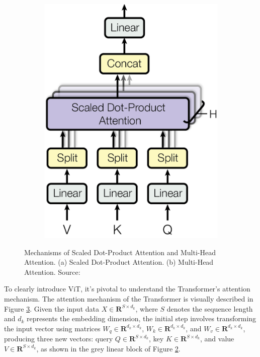 \begin{figure}
\begin{subfigure}[b]{0.2\textwidth}
        \caption{}
        \label{fig:dotproductattention}
    \end{subfigure}
    \hfill
    \begin{subfigure}[b]{0.3\textwidth}
        \centering
        \includegraphics[width=\textwidth]{assets/charts_rw/Transformer_MultiHeadAttention.png}
        \caption{}
        \label{fig:multiheadattention}
    \end{subfigure}
    \caption{Mechanisms of Scaled Dot-Product Attention and Multi-Head Attention. (a) Scaled Dot-Product Attention. (b) Multi-Head Attention. Source: \parencite{vaswani2017attention}}
    \label{fig:attentionmechanism}
\end{figure}

To clearly introduce ViT, it's pivotal to understand the Transformer's attention mechanism. The attention mechanism of the Transformer is visually described in Figure \ref{fig:attentionmechanism}. Given the input data $X \in \mathbf{R}^{S \times d_k}$, where $S$ denotes the sequence length and $d_k$ represents the embedding dimension, the initial step involves transforming the input vector using matrices $W_q \in \mathbf{R}^{d_k \times d_k}$, $W_k \in \mathbf{R}^{d_k \times d_k}$, and $W_v \in \mathbf{R}^{d_k \times d_k}$, producing three new vectors: query $Q \in \mathbf{R}^{S \times d_k}$, key $K \in \mathbf{R}^{S \times d_k}$, and value $V \in \mathbf{R}^{S \times d_k}$, as shown in the grey linear block of Figure \ref{fig:multiheadattention}.

